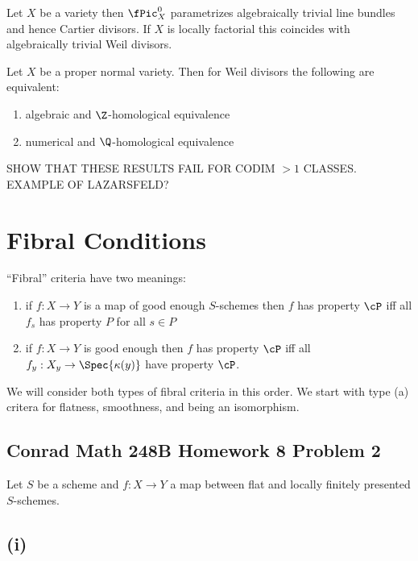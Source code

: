 \documentclass[12pt]{article}
\begin{document}
\begin{defn}

\end{defn}

\begin{prop}
Let $X$ be a variety then $\fPic^0_X$ parametrizes algebraically trivial line bundles and hence Cartier divisors. If $X$ is locally factorial this coincides with algebraically trivial Weil divisors.
\end{prop}

\begin{prop}
Let $X$ be a proper normal variety. Then for Weil divisors the following are equivalent:
\begin{enumerate}
\item algebraic and $\Z$-homological equivalence
\item numerical and $\Q$-homological equivalence
\end{enumerate}
\end{prop}

SHOW THAT THESE RESULTS FAIL FOR CODIM $>1$ CLASSES. EXAMPLE OF LAZARSFELD?

\section{Fibral Conditions}

``Fibral'' criteria have two meanings:
\begin{enumerate}
\item if $f : X \to Y$ is a map of good enough $S$-schemes then $f$ has property $\cP$ iff all $f_s$ has property $P$ for all $s \in P$
\item if $f : X \to Y$ is good enough then $f$ has property $\cP$ iff all $f_y : X_y \to \Spec{\kappa(y)}$ have property $\cP$.
\end{enumerate}
We will consider both types of fibral criteria in this order. We start with type (a) critera for flatness, smoothness, and being an isomorphism.

\subsection{Conrad Math 248B Homework 8 Problem 2}

Let $S$ be a scheme and $f : X \to Y$ a map between flat and locally finitely  presented $S$-schemes.

\subsection{(i)}
\end{document}
